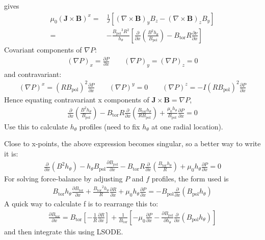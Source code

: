 \documentclass[12pt]{article}
\newcommand{\deriv}[2]{\ensuremath{\frac{\partial #1}{\partial #2}}}
\newcommand{\hthe}{\ensuremath{h_\theta}}
\newcommand{\Bp}{\ensuremath{B_{\text{pol}}}}
\newcommand{\Bt}{\ensuremath{B_{\text{tor}}}}
\newcommand{\ve}[1]{\ensuremath{\boldsymbol{#1}}}
\newcommand{\Bvec}{\ve{B}}
\newcommand{\Jvec}{\ve{J}}
\newcommand{\Curl}[1]{\ensuremath{\nabla\times #1 }}
\newcommand{\rbp}{\ensuremath{R\Bp}}
\newcommand{\rbpsq}{\ensuremath{\left(\rbp\right)^2}}
\begin{document}
%
gives
%
\begin{align*}
\mu_0 \left(\Jvec\times\Bvec\right)^x =&
\frac{1}{J}\left[\left(\Curl{\Bvec}\right)_y B_z - \left(\Curl{\Bvec}\right)_z
B_y \right]\\
=& -\frac{\Bp^3 R^2}{\hthe}\left[\deriv{}{x}\left(\frac{B^2\hthe}{\Bp}\right)
- \Bt R\deriv{\nu}{x}\right]
\end{align*}
%
Covariant components of $\nabla P$:
%
\begin{align*}
\left(\nabla P\right)_x = \deriv{P}{x} \qquad \left(\nabla P\right)_y =
\left(\nabla P\right)_z = 0
\end{align*}
%
and contravariant:
%
\begin{align*}
\left(\nabla P\right)^x = \rbpsq\deriv{P}{x} \qquad \left(\nabla P\right)^y = 0
\qquad \left(\nabla P\right)^z = -I\rbpsq\deriv{P}{x}
\end{align*}
%
Hence equating contravariant x components of $\Jvec\times\Bvec = \nabla P$,
%
\begin{align}
\deriv{}{x}\left(\frac{B^2\hthe}{\Bp}\right) - \Bt
R\deriv{}{x}\left(\frac{\Bt\hthe}{R\Bp}\right) +
\frac{\mu_0\hthe}{\Bp}\deriv{P}{x} = 0
\label{eq:xbalance}
\end{align}
%
Use this to calculate $\hthe$ profiles (need to fix $\hthe$ at one radial
location).

Close to x-points, the above expression becomes singular, so a better way to
write it is:
%
\begin{align*}
\deriv{}{x}\left(B^2\hthe\right) - \hthe\Bp\deriv{\Bp}{x} - \Bt
R\deriv{}{x}\left(\frac{\Bt\hthe}{R}\right) + \mu_0\hthe\deriv{P}{x} = 0
\end{align*}
%
For solving force-balance by adjusting $P$ and $f$ profiles, the form used is
%
\begin{align*}
\Bt\hthe\deriv{\Bt}{x} + \frac{\Bt^2\hthe}{R}\deriv{R}{x} +
\mu_0\hthe\deriv{P}{x} = -\Bp\deriv{}{x}\left(\Bp\hthe\right)
\end{align*}
%
A quick way to calculate f is to rearrange this to:
%
\begin{align*}
\deriv{\Bt}{x} = \Bt\left[-\frac{1}{R}\deriv{R}{x}\right] +
\frac{1}{\Bt}\left[-\mu_0\deriv{P}{x} -
\deriv{\Bp}{\hthe}\deriv{}{x}\left(\Bp\hthe\right)\right]
\end{align*}
%
and then integrate this using LSODE.
\end{document}
